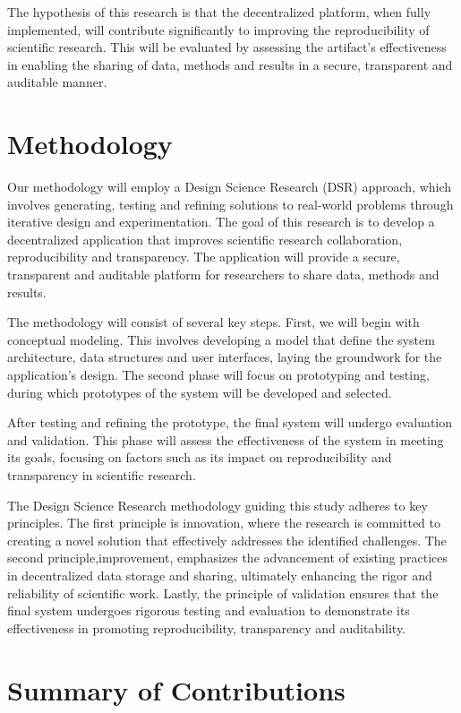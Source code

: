 \documentclass{article}
\begin{document}
The hypothesis of this research is that the decentralized platform, when fully implemented, will contribute significantly to improving the reproducibility of scientific research. This will be evaluated by assessing the artifact’s effectiveness in enabling the sharing of data, methods and results in a secure, transparent and auditable manner.

\section{Methodology}

Our methodology will employ a Design Science Research (DSR) \cite{hevner2004design}approach, which involves generating, testing and refining solutions to real-world problems through iterative design and experimentation. The goal of this research is to develop a decentralized application that improves scientific research collaboration, reproducibility and transparency. The application will provide a secure, transparent and auditable platform for researchers to share data, methods and results.

The methodology will consist of several key steps. First, we will begin with conceptual modeling. This involves developing a model that define the system architecture, data structures and user interfaces, laying the groundwork for the application’s design. The second phase will focus on prototyping and testing, during which prototypes of the system will be developed and selected.

After testing and refining the prototype, the final system will undergo evaluation and validation. This phase will assess the effectiveness of the system in meeting its goals, focusing on factors such as its impact on reproducibility and transparency in scientific research.

The Design Science Research methodology guiding this study adheres to key principles. The first principle is innovation, where the research is committed to creating a novel solution that effectively addresses the identified challenges. The second principle,improvement, emphasizes the advancement of existing practices in decentralized data storage and sharing, ultimately enhancing the rigor and reliability of scientific work. Lastly, the principle of validation ensures that the final system undergoes rigorous testing and evaluation to demonstrate its effectiveness in promoting reproducibility, transparency and auditability.

\section{Summary of Contributions}
\end{document}
